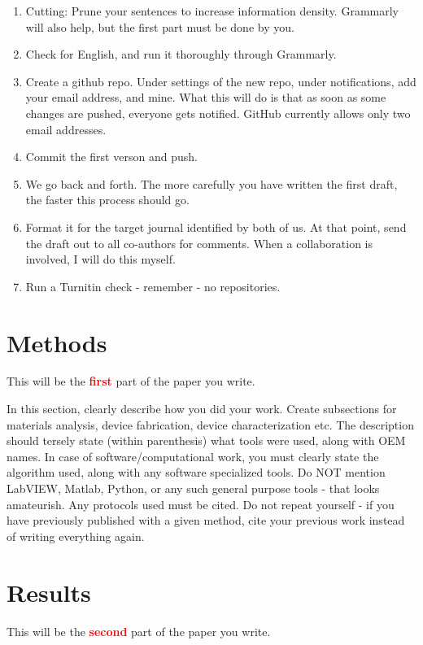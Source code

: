 \documentclass[12 pt]{article}
\begin{document}
\begin{enumerate}
\item Cutting: Prune your sentences to increase information density. Grammarly will also help, but the first part must be done by you.
\item Check for English\cite{burchfield:1998,strunk:2000}, and run it thoroughly through Grammarly.
\item Create a github repo. Under settings of the new repo, under notifications, add your email address, and mine. What this will do is that as soon as some changes are pushed, everyone gets notified. GitHub currently allows only two email addresses.
\item Commit the first verson and push.
\item We go back and forth. The more carefully you have written the first draft, the faster this process should go.
\item Format it for the target journal identified by both of us. At that point, send the draft out to all co-authors for comments. When a collaboration is involved, I will do this myself.
\item Run a Turnitin check - remember - no repositories.
\end{enumerate}

\section{Methods}
This will be the \textbf{\Huge \textcolor{red}{first}} part of the paper you write.

In this section, clearly describe how you did your work. Create subsections for materials analysis, device fabrication, device characterization etc. The description should tersely state (within parenthesis) what tools were used, along with OEM names. In case of software/computational work, you must clearly state the algorithm used, along with any software specialized tools. Do NOT mention LabVIEW, Matlab, Python, or any such general purpose tools - that looks amateurish. Any protocols used must be cited. Do not repeat yourself - if you have previously published with a given method, cite your previous work instead of writing everything again.

\section{Results}
\label{sec:results}

This will be the \textbf{\Huge \textcolor{red}{second}} part of the paper you write.
\end{document}
